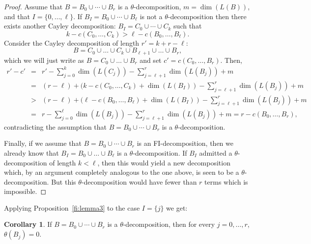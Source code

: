 \documentclass[11pt]{amsart}
\theoremstyle{plain}
\theoremstyle{definition}
\newtheorem{corollary}[theorem]{Corollary}
\theoremstyle{remark}
\newcommand{\beas}{\begin{eqnarray*}}
\newcommand{\eeas}{\end{eqnarray*}}
\numberwithin{equation}{section}
\begin{document}
\begin{proof}
Assume that   $B =  B_0 \cup \cdots \cup B_r$ is a $\theta$-decomposition, $m = \dim(L(B))$, and that $I = \{0,\dots,\ell\}$.
If $B_I =  B_0 \cup \cdots \cup B_\ell$ is not a $\theta$-decomposition then there exists another Cayley decomposition: 
$B_I = C_0\cup \cdots \cup C_k$  such that
$$k - c(C_0,\dots,C_k) > \ell - c(B_0,\dots,B_\ell).$$ 
Consider the Cayley decomposition of length $r' = k + r - \ell$: $$B = C_0 \cup \dots \cup C_k \cup B_{\ell+1} \cup \dots \cup B_r,$$
 which we
will just write as $B=C_0 \cup \dots \cup B_r$ and set 
$c' = c(C_0,\dots,B_r)$. Then, 
\beas
r' - c' &=& r' - \sum_{j=0}^k \dim(L(C_j)) - \sum_{j=\ell+1}^{r} \dim(L(B_j)) + m\\
&=&  (r - \ell) + (k - c(C_0,\dots,C_k) +\dim(L(B_I))  - \sum_{j=\ell+1}^{r} \dim(L(B_j)) + m\\
&>& (r - \ell) + (\ell - c(B_0,\dots,B_\ell) +\dim(L(B_I))  - \sum_{j=\ell+1}^{r} \dim(L(B_j)) + m\\
&=& r - \sum_{j=0}^{\ell} \dim(L(B_j)) - \sum_{j=\ell+1}^{r} \dim(L(B_j)) + m
= r - c(B_0,\dots,B_r), 
\eeas
contradicting the assumption that $B =  B_0 \cup \cdots \cup B_r$ is a $\theta$-decomposition.

Finally, if we assume that   $B =  B_0 \cup \cdots \cup B_r$ is an FI-decomposition, then we already know that 
$B_I = B_0 \cup \dots \cup B_\ell$ is
a $\theta$-decomposition. If $B_I$ admitted a $\theta$-decomposition of length $k<\ell$, then this would yield a new  decomposition which, by an argument
 completely analogous to the one above, is seen to be a $\theta$-decomposition. But this $\theta$-decomposition  would have fewer than $r$ terms which is impossible.

\end{proof}

Applying Proposition~\ref{fi:lemma3} to the case $I=\{j\}$ we get:



\begin{corollary}\label{fi:cor2} 
If $B = B_0 \cup \cdots \cup B_r$ is a $\theta$-decomposition, then 
for every $j=0,\dots,r$, $\theta(B_j) = 0$.
\end{corollary}
\end{document}
